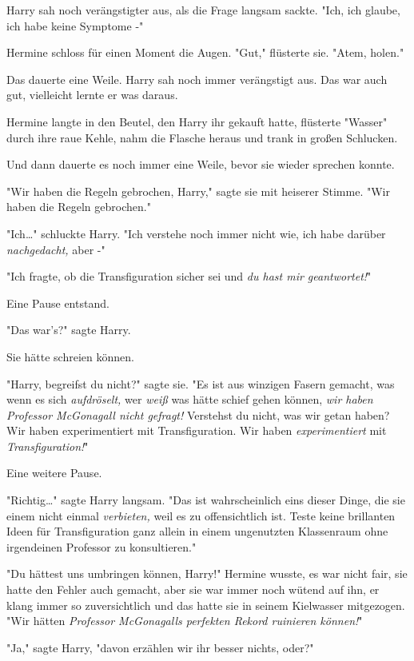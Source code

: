 {Harry sah noch verängstigter aus, als die Frage langsam sackte. "Ich, ich glaube, ich habe keine Symptome -"

Hermine schloss für einen Moment die Augen. "Gut," flüsterte sie. "Atem, holen."

Das dauerte eine Weile. Harry sah noch immer verängstigt aus. Das war auch gut, vielleicht lernte er was daraus.

Hermine langte in den Beutel, den Harry ihr gekauft hatte, flüsterte "Wasser" durch ihre raue Kehle, nahm die Flasche heraus und trank in großen Schlucken.

Und dann dauerte es noch immer eine Weile, bevor sie wieder sprechen konnte.

"Wir haben die Regeln gebrochen, Harry," sagte sie mit heiserer Stimme. "Wir haben die Regeln gebrochen."

"Ich…" schluckte Harry. "Ich verstehe noch immer nicht wie, ich habe darüber \emph{nachgedacht,} aber -"

"Ich fragte, ob die Transfiguration sicher sei und \emph{du hast mir geantwortet!}"

Eine Pause entstand.

"Das war's?" sagte Harry.

Sie hätte schreien können.

"Harry, begreifst du nicht?" sagte sie. "Es ist aus winzigen Fasern gemacht, was wenn es sich \emph{aufdröselt,} wer \emph{weiß} was hätte schief gehen können, \emph{wir haben Professor McGonagall nicht gefragt!} Verstehst du nicht, was wir getan haben? Wir haben experimentiert mit Transfiguration. Wir haben \emph{experimentiert} mit \emph{Transfiguration!}"

Eine weitere Pause.

"Richtig…" sagte Harry langsam. "Das ist wahrscheinlich eins dieser Dinge, die sie einem nicht einmal \emph{verbieten,} weil es zu offensichtlich ist. Teste keine brillanten Ideen für Transfiguration ganz allein in einem ungenutzten Klassenraum ohne irgendeinen Professor zu konsultieren."

"Du hättest uns umbringen können, Harry!" Hermine wusste, es war nicht fair, sie hatte den Fehler auch gemacht, aber sie war immer noch wütend auf ihn, er klang immer so zuversichtlich und das hatte sie in seinem Kielwasser mitgezogen. "Wir hätten \emph{Professor McGonagalls perfekten Rekord ruinieren können!}"

"Ja," sagte Harry, "davon erzählen wir ihr besser nichts, oder?"

}
